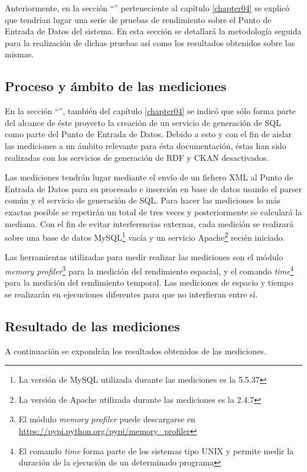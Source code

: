 Anteriormente, en la sección ``'' perteneciente al capítulo \ref{chapter04} se explicó que tendrían lugar una serie de pruebas de rendimiento sobre el Punto de Entrada de Datos del sistema.  En esta sección se detallará la metodología seguida para la realización de dichas pruebas así como los resultados obtenidos sobre las mismas.


\subsection{Proceso y ámbito de las mediciones}
\label{pruebas:proceso_ambito_mediciones}
	En la sección ``'', también del capítulo \ref{chapter04} se indicó que sólo forma parte del alcance de éste proyecto la creación de un servicio de generación de SQL como parte del Punto de Entrada de Datos.  Debido a esto y con el fin de aislar las mediciones a un ámbito relevante para ésta documentación, éstas han sido realizadas con los servicios de generación de RDF y CKAN desactivados.
	
	Las mediciones tendrán lugar mediante el envío de un fichero XML al Punto de Entrada de Datos para su procesado e inserción en base de datos usando el parser común y el servicio de generación de SQL.  Para hacer las mediciones lo más exactas posible se repetirán un total de tres veces y posteriormente se calculará la mediana.  Con el fin de evitar interferencias externas, cada medición se realizará sobre una base de datos MySQL\footnote{La versión de MySQL utilizada durante las mediciones es la 5.5.37} vacía y un servicio Apache\footnote{La versión de Apache utilizada durante las mediciones es la 2.4.7} recién iniciado.
	
	Las herramientas utilizadas para medir realizar las mediciones son el módulo \textit{memory profiler}\footnote{El módulo \textit{memory profiler} puede descargarse en \url{https://pypi.python.org/pypi/memory_profiler}} para la medición del rendimiento espacial, y el comando \textit{time}\footnote{El comando \textit{time} forma parte de los sistemas tipo UNIX y permite medir la duración de la ejecución de un determinado programa} para la medición del rendimiento temporal.  Las mediciones de espacio y tiempo se realizarán en ejecuciones diferentes para que no interfieran entre sí.
	

\subsection{Resultado de las mediciones}
	A continuación se expondrán los resultados obtenidos de las mediciones.  
	
